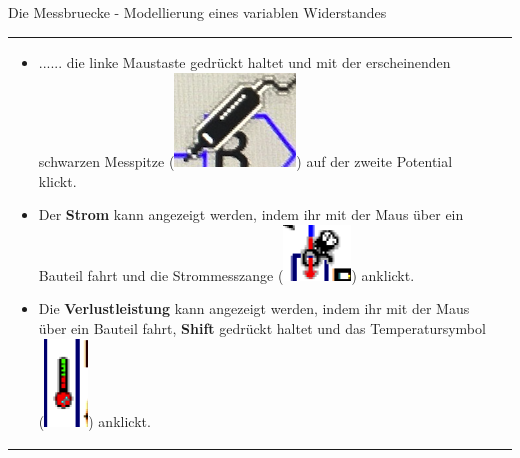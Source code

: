 \begin{frame}[t]{Die Messbruecke - Modellierung eines variablen Widerstandes}
\begin{spacing}{0.9}
\begin{tiny}
\begin{table}[h!]
\begin{tabular}{p{5cm} p{5cm}}
\begin{minipage}{0.5\textwidth}
\begin{itemize}
                \item ...... die linke Maustaste gedrückt haltet und mit der erscheinenden schwarzen Messpitze (\includegraphics[scale=0.1]{pictures/black.png}) auf der zweite Potential klickt.
                \item Der \textbf{Strom} kann angezeigt werden, indem ihr mit der Maus über ein Bauteil fahrt und die Strommesszange (\includegraphics[scale=0.1]{pictures/current.png}) anklickt.
                \item Die \textbf{Verlustleistung} kann angezeigt werden, indem ihr mit der Maus über ein Bauteil fahrt, \textbf{Shift} gedrückt haltet und das Temperatursymbol (\includegraphics[scale=0.1]{pictures/power.png}) anklickt.
            \end{itemize}
        \end{minipage} 
        \\
      \end{tabular}

    \end{table}
    \end{tiny} \end{spacing}
\end{frame}

